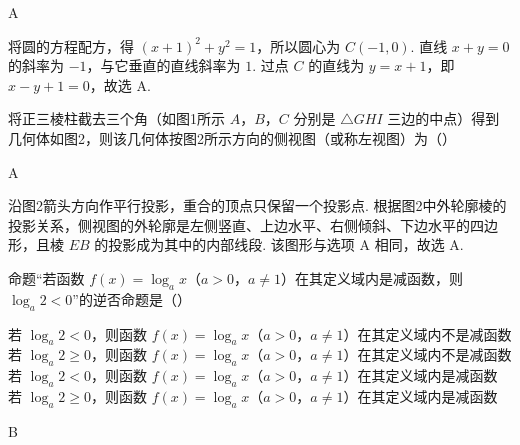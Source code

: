 \begin{answer}
A
\end{answer}

\begin{solution}
将圆的方程配方，得 \((x+1)^2+y^2=1\)，所以圆心为 \(C(-1,0)\). 直线 \(x+y=0\) 的斜率为 \(-1\)，与它垂直的直线斜率为 \(1\). 过点 \(C\) 的直线为 \(y=x+1\)，即 \(x-y+1=0\)，故选 A.
\end{solution}

\begin{problem}
将正三棱柱截去三个角（如图1所示 \(A\)，\(B\)，\(C\) 分别是 \(\triangle GHI\) 三边的中点）得到几何体如图2，则该几何体按图2所示方向的侧视图（或称左视图）为（\quad）


    {}
    {}
    {}
\end{problem}

\begin{answer}
A
\end{answer}

\begin{solution}
沿图2箭头方向作平行投影，重合的顶点只保留一个投影点. 根据图2中外轮廓棱的投影关系，侧视图的外轮廓是左侧竖直、上边水平、右侧倾斜、下边水平的四边形，且棱 \(EB\) 的投影成为其中的内部线段. 该图形与选项 A 相同，故选 A.
\end{solution}

\begin{problem}
命题“若函数 \(f(x) = \log_a x\)（\(a > 0\)，\(a \neq 1\)）在其定义域内是减函数，则 \(\log_a 2 < 0\)”的逆否命题是（\quad）

\choices
    {若 \(\log_a 2 < 0\)，则函数 \(f(x) = \log_a x\)（\(a > 0\)，\(a \neq 1\)）在其定义域内不是减函数}
    {若 \(\log_a 2 \geqslant 0\)，则函数 \(f(x) = \log_a x\)（\(a > 0\)，\(a \neq 1\)）在其定义域内不是减函数}
    {若 \(\log_a 2 < 0\)，则函数 \(f(x) = \log_a x\)（\(a > 0\)，\(a \neq 1\)）在其定义域内是减函数}
    {若 \(\log_a 2 \geqslant 0\)，则函数 \(f(x) = \log_a x\)（\(a > 0\)，\(a \neq 1\)）在其定义域内是减函数}
\end{problem}

\begin{answer}
B
\end{answer}

